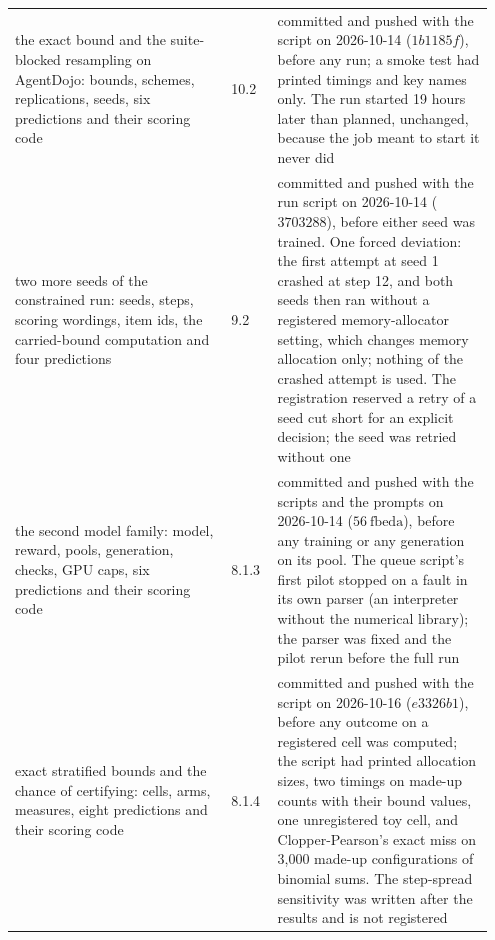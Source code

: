 \documentclass[11pt]{article}
\begin{document}
\begin{longtable}{@{}>{\raggedright\arraybackslash}p{0.428\linewidth}>{\raggedright\arraybackslash}p{0.091\linewidth}>{\raggedright\arraybackslash}p{0.428\linewidth}@{}}
\hspace{0pt}the exact bound and the suite-blocked resampling on AgentDojo: bounds, schemes, replications, seeds, six predictions and their scoring code & \hspace{0pt}10.2 & \hspace{0pt}committed and pushed with the script on 2026-10-14 ($1b 1185f$), before any run; a smoke test had printed timings and key names only. The run started 19 hours later than planned, unchanged, because the job meant to start it never did \\
\hspace{0pt}two more seeds of the constrained run: seeds, steps, scoring wordings, item ids, the carried-bound computation and four predictions & \hspace{0pt}9.2 & \hspace{0pt}committed and pushed with the run script on 2026-10-14 ($3703288$), before either seed was trained. One forced deviation: the first attempt at seed 1 crashed at step 12, and both seeds then ran without a registered memory-allocator setting, which changes memory allocation only; nothing of the crashed attempt is used. The registration reserved a retry of a seed cut short for an explicit decision; the seed was retried without one \\
\hspace{0pt}the second model family: model, reward, pools, generation, checks, GPU caps, six predictions and their scoring code & \hspace{0pt}8.1.3 & \hspace{0pt}committed and pushed with the scripts and the prompts on 2026-10-14 ($56\ \text{fbeda}$), before any training or any generation on its pool. The queue script's first pilot stopped on a fault in its own parser (an interpreter without the numerical library); the parser was fixed and the pilot rerun before the full run \\
\hspace{0pt}exact stratified bounds and the chance of certifying: cells, arms, measures, eight predictions and their scoring code & \hspace{0pt}8.1.4 & \hspace{0pt}committed and pushed with the script on 2026-10-16 ($e 3326b 1$), before any outcome on a registered cell was computed; the script had printed allocation sizes, two timings on made-up counts with their bound values, one unregistered toy cell, and Clopper-Pearson's exact miss on 3,000 made-up configurations of binomial sums. The step-spread sensitivity was written after the results and is not registered \\

\end{longtable}
\end{document}
